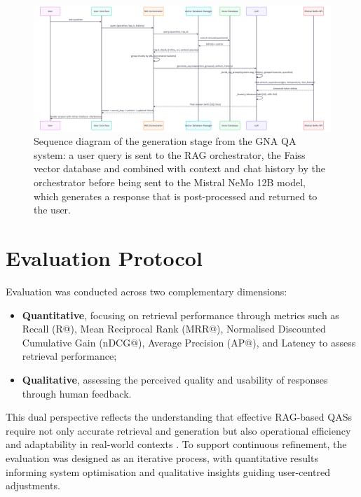\begin{spacing}{1.5}
\begin{figure}[H]
  \centering
  \includegraphics[width=\textwidth]{images/generation_workflow.png} 
  \caption{Sequence diagram of the generation stage from the GNA QA system: a user query is sent to the RAG orchestrator, the Faiss vector database and combined with context and chat history by the orchestrator before being sent to the Mistral NeMo 12B model, which generates a response that is post-processed and returned to the user.}
  \label{fig:generation_workflow}
\end{figure}


\section{Evaluation Protocol}\label{sec:evaluation_protocol}
Evaluation was conducted across two complementary dimensions: 
\begin{itemize}
      \item \textbf{Quantitative}, focusing on retrieval performance through metrics such as Recall (R@), Mean Reciprocal Rank (MRR@), Normalised Discounted Cumulative Gain (nDCG@), Average Precision (AP@), and Latency to assess retrieval performance;
      \item \textbf{Qualitative}, assessing the perceived quality and usability of responses through human feedback.
\end{itemize}

This dual perspective reflects the understanding that effective RAG-based QASs require not only accurate retrieval and generation but also operational efficiency and adaptability in real-world contexts \citep{akkiraju_facts_2024}. To support continuous refinement, the evaluation was designed as an iterative process, with quantitative results informing system optimisation and qualitative insights guiding user-centred adjustments.


\end{spacing}
